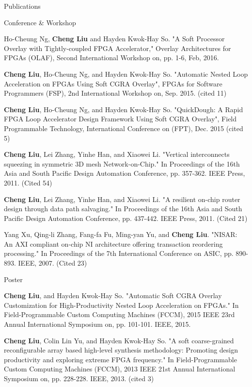 \documentclass{resume} %
\begin{document}
\begin{rSection}{Publications}
    \begin{rSubsection} {Conference \& Workshop}{}{}{}
    \item Ho-Cheung Ng, \textbf{Cheng Liu} and Hayden Kwok-Hay So. "A Soft Processor Overlay with
        Tightly-coupled FPGA Accelerator," Overlay Architectures for FPGAs (OLAF), Second
        International Workshop on, pp. 1-6, Feb, 2016. 
    \item \textbf{Cheng Liu}, Ho-Cheung Ng, and Hayden Kwok-Hay So. "Automatic Nested Loop Acceleration on
        FPGAs Using Soft CGRA Overlay", FPGAs for Software Programmers (FSP), 2nd International
        Workshop on, Sep. 2015. (cited 11)
    \item \textbf{Cheng Liu}, Ho-Cheung Ng, and Hayden Kwok-Hay So. "QuickDough: A Rapid FPGA Loop
        Accelerator Design Framework Using Soft CGRA Overlay", Field Programmable Technology,
        International Conference on (FPT), Dec. 2015 (cited 5) 
    \item \textbf{Cheng Liu}, Lei Zhang, Yinhe Han, and Xiaowei Li. "Vertical interconnects squeezing in
        symmetric 3D mesh Network-on-Chip." In Proceedings of the 16th Asia and South Pacific Design
        Automation Conference, pp. 357-362. IEEE Press, 2011. (Cited 54)
    \item \textbf{Cheng Liu}, Lei Zhang, Yinhe Han, and Xiaowei Li. "A resilient on-chip router design
        through data path salvaging." In Proceedings of the 16th Asia and South Pacific Design
        Automation Conference, pp. 437-442. IEEE Press, 2011. (Cited 21)
    \item Yang Xu, Qing-li Zhang, Fang-fa Fu, Ming-yan Yu, and \textbf{Cheng Liu}. "NISAR: An AXI compliant
        on-chip NI architecture offering transaction reordering processing." In Proceedings of the
        7th International Conference on ASIC, pp. 890-893. IEEE, 2007. (Cited 23)
    \end{rSubsection}

    \begin{rSubsection} {Poster}{}{}{}
    \item \textbf{Cheng Liu}, and Hayden Kwok-Hay So. "Automatic Soft CGRA Overlay Customization for
        High-Productivity Nested Loop Acceleration on FPGAs." In Field-Programmable Custom Computing
        Machines (FCCM), 2015 IEEE 23rd Annual International Symposium on, pp. 101-101. IEEE, 2015.
    \item \textbf{Cheng Liu}, Colin Lin Yu, and Hayden Kwok-Hay So. "A soft coarse-grained reconfigurable
        array based high-level synthesis methodology: Promoting design productivity and exploring
        extreme FPGA frequency." In Field-Programmable Custom Computing Machines (FCCM), 2013 IEEE
        21st Annual International Symposium on, pp. 228-228. IEEE, 2013. (cited 3)
    \end{rSubsection}


\end{rSection}
\end{document}
